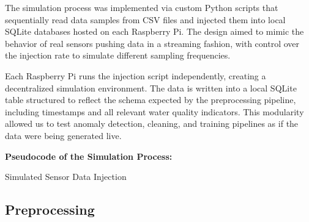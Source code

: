 The simulation process was implemented via custom Python scripts that sequentially read data samples from CSV files and injected them into local SQLite databases hosted on each Raspberry Pi. The design aimed to mimic the behavior of real sensors pushing data in a streaming fashion, with control over the injection rate to simulate different sampling frequencies.

Each Raspberry Pi runs the injection script independently, creating a decentralized simulation environment. The data is written into a local SQLite table structured to reflect the schema expected by the preprocessing pipeline, including timestamps and all relevant water quality indicators. This modularity allowed us to test anomaly detection, cleaning, and training pipelines as if the data were being generated live.

\textbf{Pseudocode of the Simulation Process:}

\begin{algorithm}[H]
    \caption{Simulated Sensor Data Injection}
    \label{alg:sensor_injection}
    \SetAlgoLined
    
\end{algorithm}





\subsection{Preprocessing}
